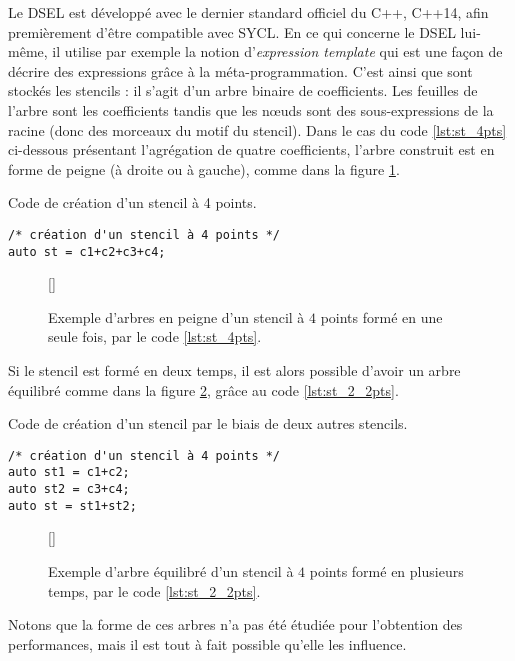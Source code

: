 Le DSEL est développé avec le dernier standard officiel du \textsf{C++}, \textsf{C++14}, afin premièrement d'être compatible avec \textsf{SYCL}. En ce qui concerne le DSEL lui-même, il utilise par exemple la notion d'\emph{expression template} \cite{Web4,Art21} qui est une façon de décrire des expressions grâce à la méta-programmation. C'est ainsi que sont stockés les stencils : il s'agit d'un arbre binaire de coefficients. Les feuilles de l'arbre sont les coefficients tandis que les nœuds sont des sous-expressions de la racine (donc des morceaux du motif du stencil). Dans le cas du code \ref{lst:st_4pts} ci-dessous présentant l'agrégation de quatre coefficients, l'arbre construit est en forme de peigne (à droite ou à gauche), comme dans la figure \ref{fig:tree1_coef}.
\begin{listing}[H]
\caption{Code de création d'un stencil à 4 points.}
\label{lst:st_4pts}
\begin{verbatim}
/* création d'un stencil à 4 points */
auto st = c1+c2+c3+c4; 
\end{verbatim}
\end{listing}
\begin{figure}[!h]
[\FBwidth]
{\caption{Exemple d'arbres en peigne d'un stencil à $4$ points formé en une seule fois, par le code \ref{lst:st_4pts}.}\label{fig:tree1_coef}}
{}
\end{figure}
Si le stencil est formé en deux temps, il est alors possible d'avoir un arbre équilibré comme dans la figure \ref{fig:tree2_coef}, grâce au code \ref{lst:st_2_2pts}.
\begin{listing}[H]
\caption{Code de création d'un stencil par le biais de deux autres stencils.}
\label{lst:st_2_2pts}
\begin{verbatim}
/* création d'un stencil à 4 points */
auto st1 = c1+c2;
auto st2 = c3+c4;
auto st = st1+st2;
\end{verbatim}
\end{listing}
\begin{figure}[!h]
[\FBwidth]
{\caption{Exemple d'arbre équilibré d'un stencil à $4$ points formé en plusieurs temps, par le code \ref{lst:st_2_2pts}.}\label{fig:tree2_coef}}
{}
\end{figure}
Notons que la forme de ces arbres n'a pas été étudiée pour l'obtention des performances, mais il est tout à fait possible qu'elle les influence. 


